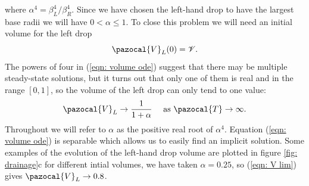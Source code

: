 \documentclass{jfm}
\begin{document}
where   $\alpha^4 = \beta_L^4/ \beta_R^4  $. 
 Since we have chosen the left-hand drop to have  the largest   base radii we will have    $0< \alpha \leq1$.
 To close this problem we will need an initial volume for  the left drop 
 \begin{equation}
    \pazocal{V}_L(0) =   \mathcal{V}. \label{eqn: v initial}
 \end{equation}
The powers of four in  (\ref{eqn: volume ode}) suggest that there may be multiple steady-state solutions, but  it turns out that only one of them is real and in the range $[0,1]$, so the volume of the left drop can only tend to one value:  
\begin{equation}
\pazocal{V}_L \to \frac{1}{1+\alpha} \quad \text{ as } {\pazocal{T}} \to \infty. \label{eqn: V lim}
\end{equation}
Throughout we will refer to $\alpha $ as the positive real root of $\alpha^4$.
Equation  (\ref{eqn: volume ode}) is separable which allows us to easily find an   implicit solution.
Some examples of the evolution of the left-hand drop volume  are plotted in figure \ref{fig: drainage}c  for  different intial volumes, we have taken    $\alpha = 0.25$, so (\ref{eqn: V lim}) gives   $\pazocal{V}_L \to 0.8$.
\end{document}

